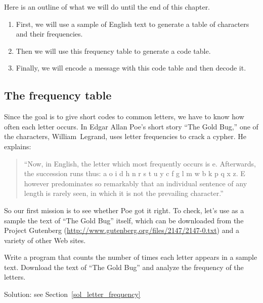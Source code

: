 Here is an outline of what we will do until the end of this 
chapter.

\begin{enumerate}

\item First, we will use a sample of English text to generate 
a table of characters and their frequencies.

\item Then we will use this frequency table to generate a code 
table.

\item Finally, we will encode a message with this code table 
and then decode it.

\end{enumerate}

\subsection{The frequency table}

Since the goal is to give short codes to common letters, we 
have to know how often each letter occurs. In Edgar Allan Poe’s 
short story ``The Gold Bug,'' one of the characters, William~Legrand, 
uses letter frequencies to crack a cypher. He explains:

\begin{quote}
``Now, in English, the letter which most frequently occurs 
is e. Afterwards, the succession runs thus: a o i d h n r s 
t u y c f g l m w b k p q x z. E however predominates so 
remarkably that an individual sentence of any length is 
rarely seen, in which it is not the prevailing character.''
\end{quote}

So our first mission is to see whether Poe got it right. 
To check, let's use as a sample the text of ``The Gold Bug'' 
itself, which can be downloaded from the Project Gutenberg 
(\url{http://www.gutenberg.org/files/2147/2147-0.txt}) and 
a variety of other Web sites. 

\begin{exercise}
\label{letter_frequency}
Write a program that counts the number of times each letter 
appears in a sample text. Download the text of ``The Gold Bug'' 
and analyze the frequency of the letters.

Solution: see Section~\ref{sol_letter_frequency}
\end{exercise}

